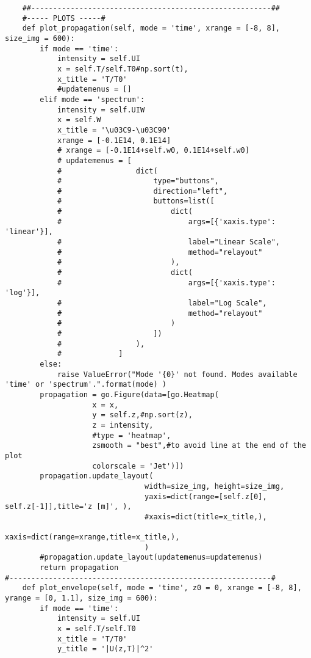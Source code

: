 \begin{verbatim}
    ##-------------------------------------------------------##
    #----- PLOTS -----#
    def plot_propagation(self, mode = 'time', xrange = [-8, 8], size_img = 600):
        if mode == 'time':
            intensity = self.UI
            x = self.T/self.T0#np.sort(t),
            x_title = 'T/T0'
            #updatemenus = []
        elif mode == 'spectrum':
            intensity = self.UIW
            x = self.W
            x_title = '\u03C9-\u03C90'
            xrange = [-0.1E14, 0.1E14]
            # xrange = [-0.1E14+self.w0, 0.1E14+self.w0]
            # updatemenus = [
            #                 dict(
            #                     type="buttons",
            #                     direction="left",
            #                     buttons=list([
            #                         dict(
            #                             args=[{'xaxis.type': 'linear'}],
            #                             label="Linear Scale",
            #                             method="relayout"
            #                         ),
            #                         dict(
            #                             args=[{'xaxis.type': 'log'}],
            #                             label="Log Scale",
            #                             method="relayout"
            #                         )
            #                     ])
            #                 ),
            #             ]
        else:
            raise ValueError("Mode '{0}' not found. Modes available 'time' or 'spectrum'.".format(mode) )
        propagation = go.Figure(data=[go.Heatmap(
                    x = x,
                    y = self.z,#np.sort(z),
                    z = intensity,
                    #type = 'heatmap',
                    zsmooth = "best",#to avoid line at the end of the plot
                    colorscale = 'Jet')])
        propagation.update_layout(
                                width=size_img, height=size_img,
                                yaxis=dict(range=[self.z[0], self.z[-1]],title='z [m]', ), 
                                #xaxis=dict(title=x_title,), 
                                xaxis=dict(range=xrange,title=x_title,), 
                                )
        #propagation.update_layout(updatemenus=updatemenus)
        return propagation
#------------------------------------------------------------#
    def plot_envelope(self, mode = 'time', z0 = 0, xrange = [-8, 8],  yrange = [0, 1.1], size_img = 600):
        if mode == 'time':
            intensity = self.UI
            x = self.T/self.T0
            x_title = 'T/T0'
            y_title = '|U(z,T)|^2'

\end{verbatim}
